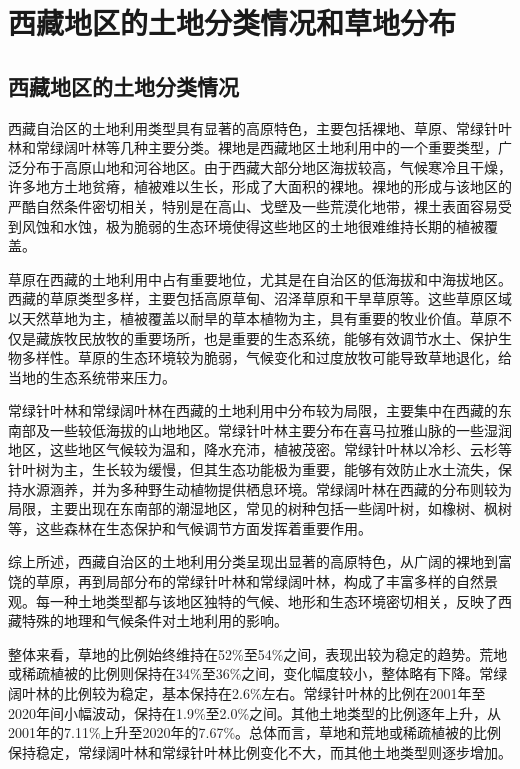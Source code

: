\documentclass[AutoFakeBold]{LZUThesis-PgD&PhD}
\begin{document}
    \section{西藏地区的土地分类情况和草地分布}


    \subsection{西藏地区的土地分类情况}
		\par
		西藏自治区的土地利用类型具有显著的高原特色，主要包括裸地、草原、常绿针叶林和常绿阔叶林等几种主要分类。裸地是西藏地区土地利用中的一个重要类型，广泛分布于高原山地和河谷地区。由于西藏大部分地区海拔较高，气候寒冷且干燥，许多地方土地贫瘠，植被难以生长，形成了大面积的裸地。裸地的形成与该地区的严酷自然条件密切相关，特别是在高山、戈壁及一些荒漠化地带，裸土表面容易受到风蚀和水蚀，极为脆弱的生态环境使得这些地区的土地很难维持长期的植被覆盖。
		
		草原在西藏的土地利用中占有重要地位，尤其是在自治区的低海拔和中海拔地区。西藏的草原类型多样，主要包括高原草甸、沼泽草原和干旱草原等。这些草原区域以天然草地为主，植被覆盖以耐旱的草本植物为主，具有重要的牧业价值。草原不仅是藏族牧民放牧的重要场所，也是重要的生态系统，能够有效调节水土、保护生物多样性。草原的生态环境较为脆弱，气候变化和过度放牧可能导致草地退化，给当地的生态系统带来压力。
		
		常绿针叶林和常绿阔叶林在西藏的土地利用中分布较为局限，主要集中在西藏的东南部及一些较低海拔的山地地区。常绿针叶林主要分布在喜马拉雅山脉的一些湿润地区，这些地区气候较为温和，降水充沛，植被茂密。常绿针叶林以冷杉、云杉等针叶树为主，生长较为缓慢，但其生态功能极为重要，能够有效防止水土流失，保持水源涵养，并为多种野生动植物提供栖息环境。常绿阔叶林在西藏的分布则较为局限，主要出现在东南部的潮湿地区，常见的树种包括一些阔叶树，如橡树、枫树等，这些森林在生态保护和气候调节方面发挥着重要作用。
		
		综上所述，西藏自治区的土地利用分类呈现出显著的高原特色，从广阔的裸地到富饶的草原，再到局部分布的常绿针叶林和常绿阔叶林，构成了丰富多样的自然景观。每一种土地类型都与该地区独特的气候、地形和生态环境密切相关，反映了西藏特殊的地理和气候条件对土地利用的影响。
		
		
		整体来看，草地的比例始终维持在52\%至54\%之间，表现出较为稳定的趋势。荒地或稀疏植被的比例则保持在34\%至36\%之间，变化幅度较小，整体略有下降。常绿阔叶林的比例较为稳定，基本保持在2.6\%左右。常绿针叶林的比例在2001年至2020年间小幅波动，保持在1.9\%至2.0\%之间。其他土地类型的比例逐年上升，从2001年的7.11\%上升至2020年的7.67\%。总体而言，草地和荒地或稀疏植被的比例保持稳定，常绿阔叶林和常绿针叶林比例变化不大，而其他土地类型则逐步增加。
		
\end{document}
